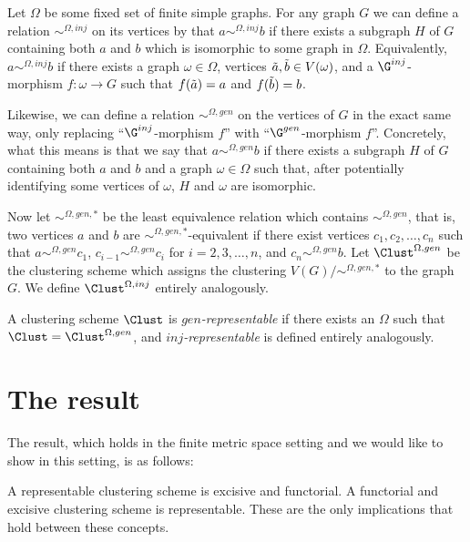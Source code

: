 \documentclass[a4paper,reqno,oneside]{article} %
\begin{document}
\begin{definition}
Let $\Omega$ be some fixed set of finite simple graphs. For any graph $G$ we can define a relation $\sim^{\Omega,inj}$ on its vertices by that $a \sim^{\Omega, inj} b$ if there exists a subgraph $H$ of $G$ containing both $a$ and $b$ which is isomorphic to some graph in $\Omega$. Equivalently, $a \sim^{\Omega,inj} b$ if there exists a graph $\omega \in \Omega$, vertices $\Tilde{a}, \Tilde{b} \in V(\omega)$, and a $\G^{inj}$-morphism $f: \omega \to G$ such that $f(\Tilde{a}) = a$ and $f(\Tilde{b}) = b$.

Likewise, we can define a relation $\sim^{\Omega,gen}$ on the vertices of $G$ in the exact same way, only replacing ``$\G^{inj}$-morphism $f$'' with ``$\G^{gen}$-morphism $f$''. Concretely, what this means is that we say that $a \sim^{\Omega,gen} b$ if there exists a subgraph $H$ of $G$ containing both $a$ and $b$ and a graph $\omega \in \Omega$ such that, after potentially identifying some vertices of $\omega$, $H$ and $\omega$ are isomorphic.

Now let $\sim^{\Omega,gen,*}$ be the least equivalence relation which contains $\sim^{\Omega,gen}$, that is, two vertices $a$ and $b$ are $\sim^{\Omega,gen,*}$-equivalent if there exist vertices $c_1, c_2,\ldots, c_n$ such that $a \sim^{\Omega,gen} c_1$, $c_{i-1} \sim^{\Omega,gen} c_i$ for $i = 2, 3, \ldots, n$, and $c_n \sim^{\Omega,gen} b$. Let $\Clust^{\Omega, gen}$ be the clustering scheme which assigns the clustering $V(G)/{\sim}^{\Omega,gen,*}$ to the graph $G$. We define $\Clust^{\Omega, inj}$ entirely analogously.

A clustering scheme $\Clust$ is \emph{$gen$-representable} if there exists an $\Omega$ such that $\Clust = \Clust^{\Omega,gen}$, and \emph{$inj$-representable} is defined entirely analogously.
\end{definition}

\section{The result}

The result, which holds in the finite metric space setting and we would like to show in this setting, is as follows:

\begin{theorem}\label{excisive_iff_representable}
A representable clustering scheme is excisive and functorial. A functorial and excisive clustering scheme is representable. These are the only implications that hold between these concepts.
\end{theorem}
\end{document}
